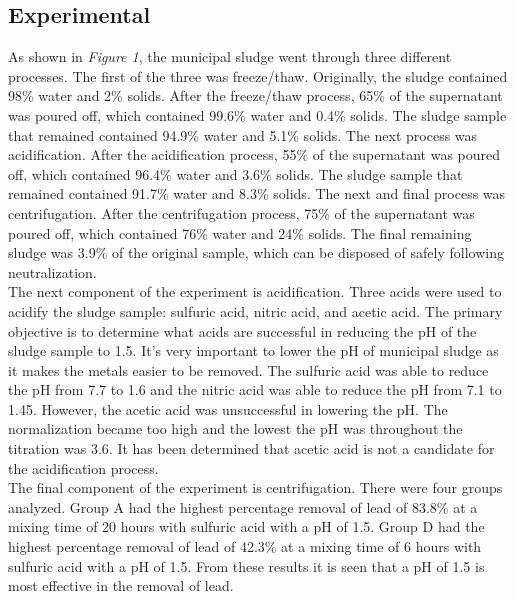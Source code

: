 \documentclass{article}
\begin{document}
    \subsection{Experimental}
    \indent As shown in \textit{Figure 1}, the municipal sludge went through three different processes. The first of the three was freeze/thaw. Originally, the sludge contained 98\% water and 2\% solids. After the freeze/thaw process, 65\% of the supernatant was poured off, which contained 99.6\% water and 0.4\% solids. The sludge sample that remained contained 94.9\% water and 5.1\% solids. The next process was acidification. After the acidification process, 55\% of the supernatant was poured off, which contained 96.4\% water and 3.6\% solids. The sludge sample that remained contained 91.7\% water and 8.3\% solids. The next and final process was centrifugation. After the centrifugation process, 75\% of the supernatant was poured off, which contained 76\% water and 24\% solids. The final remaining sludge was 3.9\% of the original sample, which can be disposed of safely following neutralization.\\
    \indent The next component of the experiment is acidification. Three acids were used to acidify the sludge sample: sulfuric acid, nitric acid, and acetic acid. The primary objective is to determine what acids are successful in reducing the pH of the sludge sample to 1.5. It's very important to lower the pH of municipal sludge as it makes the metals easier to be removed. The sulfuric acid was able to reduce the pH from 7.7 to 1.6 and the nitric acid was able to reduce the pH from 7.1 to 1.45. However, the acetic acid was unsuccessful in lowering the pH. The normalization became too high and the lowest the pH was throughout the titration was 3.6. It has been determined that acetic acid is not a candidate for the acidification process.\\
    \indent The final component of the experiment is centrifugation. There were four groups analyzed. Group A had the highest percentage removal of lead of 83.8\% at a mixing time of 20 hours with sulfuric acid with a pH of 1.5. Group D had the highest percentage removal of lead of 42.3\% at a mixing time of 6 hours with sulfuric acid with a pH of 1.5. From these results it is seen that a pH of 1.5 is most effective in the removal of lead.
    \newpage
\end{document}
